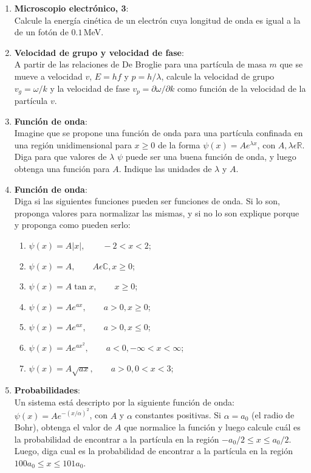 \documentclass[a4paper,12pt]{article}
\begin{document}
\begin{enumerate}
\item{\bf{Microscopio electrónico, 3}}:\\
	Calcule la energía cinética de un electrón cuya longitud de onda es igual a
		la de un fotón de $0.1$\,MeV.

\item {\bf{Velocidad de grupo y velocidad de fase}}:\\
	A partir de las relaciones de De Broglie para una partícula de masa $m$ que
		se mueve a velocidad $v$, $E=hf$ y $p=h/\lambda$, calcule la velocidad
		de grupo $v_g=\omega / k$ y la velocidad de fase $v_p=\partial
		\omega/\partial k$ como función de la velocidad de la partícula $v$.

\item{\bf{Función de onda}}:\\
	Imagine que se propone una función de onda para una partícula confinada en
		una región unidimensional para $x\geq0$ de la forma $\psi(x)=A
		e^{\lambda x}$, con $A,\lambda \epsilon \mathbb{R}$. Diga para que
		valores de $\lambda$ $\psi$ puede ser una buena función de onda, y
		luego obtenga una función para $A$. Indique las unidades de $\lambda$ y
		$A$. 

\item{\bf{Función de onda}}:\\
	Diga si las siguientes funciones pueden ser funciones de onda. Si lo son,
		proponga valores para normalizar las mismas, y si no lo son explique
		porque y proponga como pueden serlo:
		\begin{enumerate}
			\item $\psi(x) = A |x|, \qquad -2 < x < 2$;
			\item $\psi(x) = A, \qquad  A\epsilon \mathbb C, x \geq 0$;
			\item $\psi(x) = A \tan x, \qquad x \geq 0$;
			\item $\psi(x) = A e^{a x}, \qquad a>0, x\geq 0$;
			\item $\psi(x) = A e^{a x}, \qquad a>0, x\leq 0$;
			\item $\psi(x) = A e^{a x^2}, \qquad a<0, -\infty < x < \infty$;
			\item $\psi(x) = A \sqrt{a x}, \qquad a>0, 0 < x < 3$;
		\end{enumerate}

\item{\bf{Probabilidades}}:\\
	Un sistema está descripto por la siguiente función de onda: $\psi(x)=A
		e^{-(x/\alpha)^2}$, con $A$ y $\alpha$ constantes positivas. Si
		$\alpha=a_0$ (el radio de Bohr), obtenga el valor de $A$ que normalice
		la función y luego calcule cuál es la probabilidad de encontrar a la
		partícula en la región $-a_0/2 \leq x \leq a_0/2$. Luego, diga cual
		es la probabilidad de encontrar a la partícula en la región $100 a_0
		\leq x \leq 101 a_0$.


\end{enumerate}
\end{document}
